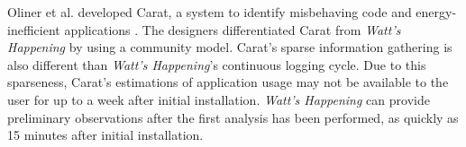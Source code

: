 Oliner et al. developed Carat, a system to identify misbehaving code and energy-inefficient applications \cite{Oliner:2012:CED:2387858.2387864}.
The designers differentiated Carat from \emph{Watt's Happening} by using a community model.
Carat's sparse information gathering is also different than \emph{Watt's Happening}'s continuous logging cycle.
Due to this sparseness, Carat's estimations of application usage may not be available to the user for up to a week after initial installation.
\emph{Watt's Happening} can provide preliminary observations after the first analysis has been performed, as quickly as 15 minutes after initial installation.

%
% 	
% 
